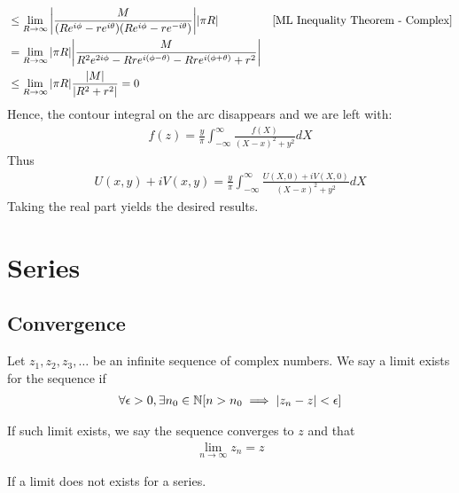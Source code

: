\documentclass[12pt, english]{book}
\makeatletter
\renewenvironment{proof}[1][\proofname]{\par
	\pushQED{\qed}%
	\normalfont \topsep6\p@\@plus6\p@\relax
	\list{}{%
		\settowidth{\leftmargin}{\itshape\proofname:\hskip\labelsep}%
		\setlength{\labelwidth}{0pt}%
		\setlength{\itemindent}{-\leftmargin}%
	}%
	\item[\hskip\labelsep\itshape#1\@addpunct{:}]\ignorespaces
}{%
	\popQED\endlist\@endpefalse
}
\makeatother
\begin{document}
\begin{proof}
{\begin{align*}
			&\leq\lim_{R \rightarrow \infty} 
			 \abs{\frac{M}{(Re^{i\phi} - re^{i\theta})(Re^{i\phi} - re^{-i\theta})}} \abs{\pi R} & \Cref{ML Inequality Theorem - Complex} \\
			&= \lim_{R \rightarrow \infty} \abs{\pi R} 
			   \abs{\frac{M}{R^2 e^{2i\phi} - Rre^{i(\phi - \theta)} - Rre^{i(\phi + \theta)} + r^2}} \\
			&\leq \lim_{R \rightarrow \infty} \abs{\pi R} \frac{\abs{M}}{\abs{R^2 + r^2}}
			= 0 
		\end{align*}
		}
		Hence, the contour integral on the arc disappears and we are left with:
		\begin{align*}
			f(z)  = \frac{y}{\pi} \int_{-\infty}^{\infty} \frac{f(X)}{(X-x)^2 + y^2} dX
		\end{align*}
		Thus
		\begin{align*}
			U(x,y) + iV(x,y) = \frac{y}{\pi} \int_{-\infty}^{\infty} \frac{U(X, 0) + iV(X,0)}{(X-x)^2 + y^2} dX
		\end{align*}
		Taking the real part yields the desired results.
	\end{proof}

	\chapter{Series} \label{Series Chapter - Complex}
	
	\section{Convergence} \label{Convergence Section - Complex}
	
	\begin{definition}[Limit]
		Let \(z_1, z_2, z_3, \ldots \) be an infinite sequence of complex numbers. We say a limit exists for the sequence if
		\begin{align*}
			\forall \epsilon > 0, \exists n_0 \in \mathbb{N}
			[n > n_0 \implies \abs{z_n - z} < \epsilon]
		\end{align*}
	\end{definition}
	
	\begin{definition}
		If such limit exists, we say the sequence converges to \(z\) and that 
		\begin{align*}
			\lim_{n \rightarrow \infty} z_n = z
		\end{align*}
	\end{definition}
	
	\begin{definition}
		If a limit does not exists for a series.
	\end{definition}
	
\end{document}
